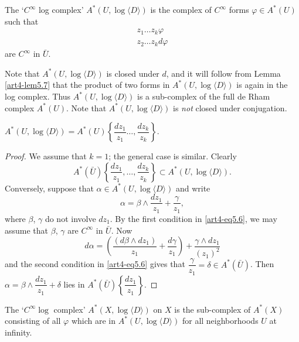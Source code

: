 \setcounter{definition}{5}
\begin{definition}\label{art4-def5.6}
The `$C^\infty$ log complex' $A^\ast (U, \log \langle D\rangle)$ is the complex of $C^\infty$ forms $\varphi \in A^\ast (U)$ such that
\begin{gather*}
z_1 \ldots z_k \varphi \\
z_2 \ldots z_k d \varphi 
\end{gather*}
are $C^\infty$ in $\bar{U}$.
\end{definition}

Note that $A^\ast (U, \log \langle D \rangle)$ is closed under $d$, and it will follow from Lemma \eqref{art4-lem5.7} that the product of two forms in $A^\ast (U, \log \langle D \rangle )$ is again in the log complex. Thus $A^\ast (U, \log \langle D \rangle)$ is a sub-complex of the full de Rham complex $A^\ast (U)$. Note that $A^\ast (U, \log \langle D \rangle)$ is \textit{not} closed under conjugation.

\setcounter{lemma}{6}
\begin{lemma}\label{art4-lem5.7}
$A^\ast (U, \log \langle D \rangle) = A^\ast (U) \left\{\dfrac{dz_1}{z_1} \ldots , \dfrac{dz_k}{z_k} \right\}$.
\end{lemma}

\begin{proof}
We assume that $k =1$; the general case is similar. Clearly
$$
A^\ast (\bar{U}) \left\{\frac{dz_1}{z_1}, \ldots, \frac{dz_k}{z_k} \right\} \subset A^\ast (U, \log \langle D \rangle).
$$
Conversely, suppose that $\alpha \in A^\ast (U, \log\langle D \rangle)$  and write 
$$
\alpha = \beta \wedge \frac{dz_1}{z_1} + \frac{\gamma}{z_1},
$$
where $\beta$, $\gamma$ do not involve $dz_1$. By the first condition in \eqref{art4-eq5.6}, we may assume that $\beta$, $\gamma$ are $C^\infty$ in $\bar{U}$. Now
$$
d\alpha = \left(\frac{(d \beta \wedge dz_1)}{z_1} + \frac{d\gamma}{z_1} \right) + \frac{\gamma \wedge dz_1}{(z_1)^2}
$$\pageoriginale
and the second condition in \eqref{art4-eq5.6} gives that $\dfrac{\gamma}{z_1} = \delta \in A^\ast (\bar{U})$. Then $\alpha = \beta \wedge \dfrac{dz_1}{z_1} + \delta$ lies in $A^\ast (\bar{U}) \left\{\dfrac{dz_1}{z_1} \right\}$.
\end{proof}

\setcounter{definition}{7}
\begin{definition}\label{art4-def5.8}
The `$C^\infty \log$ complex' $A^\ast (X, \log \langle D \rangle)$ on $X$ is the sub-complex of $A^\ast (X)$ consisting of all $\varphi$ which are in $A^\ast (U, \log \langle D \rangle)$ for all neighborhoods $U$ at infinity.
\end{definition}

